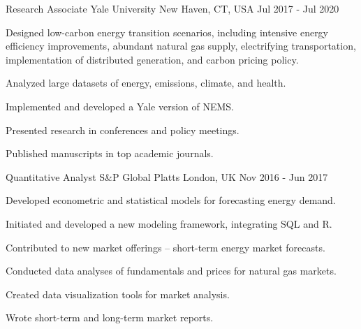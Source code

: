\begin{cventries}
    \cventry
    {Research Associate} %
    {Yale University} %
    {New Haven, CT, USA} %
    {Jul 2017 - Jul 2020} %
    {
        \begin{cvitems} %
            \item {Designed low-carbon energy transition scenarios, including intensive energy efficiency improvements, abundant natural gas supply, electrifying transportation, implementation of distributed generation, and carbon pricing policy.}
            \item {Analyzed large datasets of energy, emissions, climate, and health.}
            \item {Implemented and developed a Yale version of NEMS.}
            \item {Presented research in conferences and policy meetings.}
            \item {Published manuscripts in top academic journals.}
        \end{cvitems}
    }

    \cventry
    {Quantitative Analyst} %
    {S\&P Global Platts} %
    {London, UK} %
    {Nov 2016 - Jun 2017} %
    {
        \begin{cvitems} %
            \item {Developed econometric and statistical models for forecasting energy demand.}
            \item {Initiated and developed a new modeling framework, integrating SQL and R.}
            \item {Contributed to new market offerings -- short-term energy market forecasts.}
            \item {Conducted data analyses of fundamentals and prices for natural gas markets.}
            \item {Created data visualization tools for market analysis.}
            \item {Wrote short-term and long-term market reports.}
        \end{cvitems}
    }


\end{cventries}
